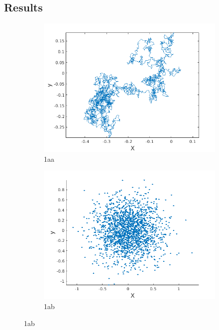 \documentclass[a4paper]{article}
\begin{document}
		 
		
		\subsection{Results} \label{1:results}
		\begin{figure}
			\begin{subfigure} {.5\columnwidth}
				\includegraphics[width=\columnwidth]{../plots/1aa_randomwalk.png}
				\caption{1aa}
				\label{fig:1aa}
			\end{subfigure}%
			\hfill
			\begin{subfigure} {.5\columnwidth}
				\includegraphics[width=\columnwidth]{../plots/1ab_randomwalk.png}
				\caption{1ab}
				\label{fig:1ab}
			\end{subfigure}
			

\end{figure}
\end{document}

